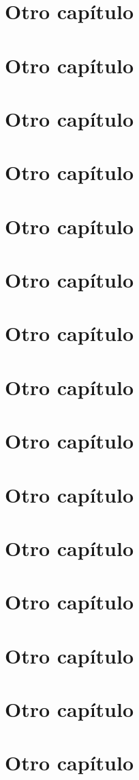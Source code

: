 \documentclass[a4paper,11pt]{memoir}
\begin{document}
\chapter{Otro capítulo}
\chapter{Otro capítulo}
\chapter{Otro capítulo}
\chapter{Otro capítulo}
\chapter{Otro capítulo}
\chapter{Otro capítulo}
\chapter{Otro capítulo}
\chapter{Otro capítulo}
\chapter{Otro capítulo}
\chapter{Otro capítulo}
\chapter{Otro capítulo}
\chapter{Otro capítulo}
\chapter{Otro capítulo}
\chapter{Otro capítulo}
\chapter{Otro capítulo}
\end{document}
